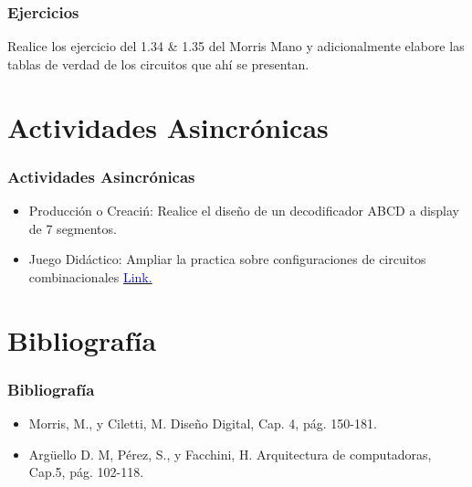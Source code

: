 \documentclass[11pt]{beamer}
\begin{document}
\begin{frame}
\frametitle{Ejercicios}
Realice los ejercicio del 1.34 \& 1.35 del Morris Mano y adicionalmente elabore las tablas de verdad de los circuitos que ah\'i se presentan.
\end{frame}

\section{Actividades Asincr\'onicas}
\begin{frame}
\frametitle{Actividades Asincr\'onicas}
	\begin{itemize}
		\item Producci\'on o Creaci\'n: Realice el diseño de un decodificador ABCD a display de 7 segmentos.
		\item Juego Did\'actico: Ampliar la practica sobre configuraciones de circuitos combinacionales \href{https://es.educaplay.com/recursos-educativos/4647989-circuitos_combinacionales.html}{\textcolor{blue}{Link.}}
		\end{itemize}
\end{frame}

\section{Bibliograf\'ia}
\begin{frame}
	\frametitle{Bibliograf\'ia}
	\begin{itemize}
		\item Morris, M., y Ciletti, M. Diseño Digital, Cap. 4, pág. 150-181.
		\item Argüello D. M, Pérez, S., y Facchini, H. Arquitectura de computadoras, Cap.5, pág. 102-118.
		\end{itemize}
\end{frame}
\end{document}
